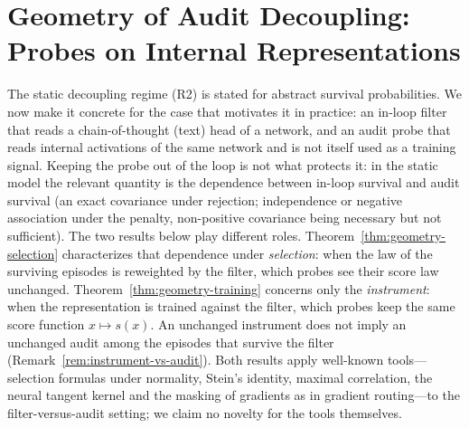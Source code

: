 
\section{Geometry of Audit Decoupling: Probes on Internal Representations}\label{sec:geometry}

The static decoupling regime (R2) is stated for abstract survival probabilities. We now make it concrete for the case that motivates it in practice: an in-loop filter that reads a chain-of-thought (text) head of a network, and an audit probe that reads internal activations of the same network and is not itself used as a training signal. Keeping the probe out of the loop is not what protects it: in the static model the relevant quantity is the dependence between in-loop survival and audit survival (an exact covariance under rejection; independence or negative association under the penalty, non-positive covariance being necessary but not sufficient). The two results below play different roles. Theorem~\ref{thm:geometry-selection} characterizes that dependence under \emph{selection}: when the law of the surviving episodes is reweighted by the filter, which probes see their score law unchanged. Theorem~\ref{thm:geometry-training} concerns only the \emph{instrument}: when the representation is trained against the filter, which probes keep the same score function $x \mapsto s(x)$. An unchanged instrument does not imply an unchanged audit among the episodes that survive the filter (Remark~\ref{rem:instrument-vs-audit}). Both results apply well-known tools---selection formulas under normality, Stein's identity, maximal correlation, the neural tangent kernel and the masking of gradients as in gradient routing---to the filter-versus-audit setting; we claim no novelty for the tools themselves.

